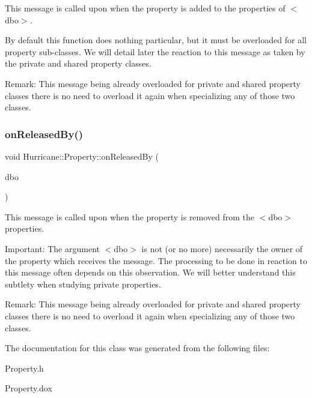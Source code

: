 This message is called upon when the property is added to the properties of {\ttfamily $<$dbo$>$}.

By default this function does nothing particular, but it must be overloaded for all property sub-\/classes. We will detail later the reaction to this message as taken by the private and shared property classes.

\begin{DoxyParagraph}{Remark\+: This message being already overloaded for private and shared }
property classes there is no need to overload it again when specializing any of those two classes. 
\end{DoxyParagraph}
\mbox{\label{classHurricane_1_1Property_a0ea7ee2089f1463c0c16e30313b54083}} 
\subsubsection{\texorpdfstring{on\+Released\+By()}{onReleasedBy()}}
{\footnotesize\ttfamily void Hurricane\+::\+Property\+::on\+Released\+By (\begin{DoxyParamCaption}\item[{\mbox{\hyperlink{classHurricane_1_1DBo}{D\+Bo}} $\ast$}]{dbo }\end{DoxyParamCaption})\hspace{0.3cm}{\ttfamily [pure virtual]}}

This message is called upon when the property is removed from the {\ttfamily $<$dbo$>$} properties.

\begin{DoxyParagraph}{Important\+: The argument {\ttfamily $<$dbo$>$} is not (or no more) necessarily the }
owner of the property which receives the message. The processing to be done in reaction to this message often depends on this observation. We will better understand this subtlety when studying private properties.
\end{DoxyParagraph}
\begin{DoxyParagraph}{Remark\+: This message being already overloaded for private and shared }
property classes there is no need to overload it again when specializing any of those two classes. 
\end{DoxyParagraph}


The documentation for this class was generated from the following files\+:\begin{DoxyCompactItemize}
\item 
Property.\+h\item 
Property.\+dox\end{DoxyCompactItemize}
